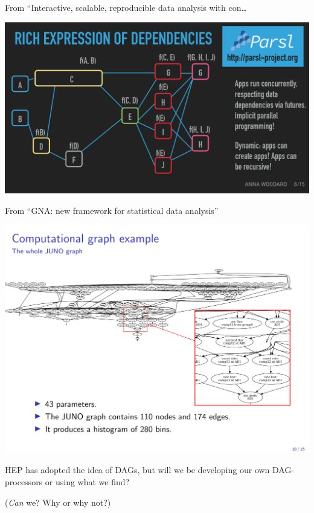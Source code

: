 \documentclass[aspectratio=169]{beamer}
\begin{document}
\begin{frame}{From ``Interactive, scalable, reproducible data analysis with con\ldots}
\begin{center}
\includegraphics[width=\linewidth]{parsl.png}
\end{center}
\end{frame}

\begin{frame}{From ``GNA: new framework for statistical data analysis''}
\begin{center}
\includegraphics[width=0.75\linewidth]{juno.png}
\end{center}
\end{frame}

\begin{frame}{}
\Large
\vspace{0.5 cm}
\begin{center}
HEP has adopted the idea of DAGs, but will we be developing our own DAG-processors or using what we find?

\vspace{1 cm}
({\it Can} we? Why or why not?)
\end{center}
\end{frame}
\end{document}
